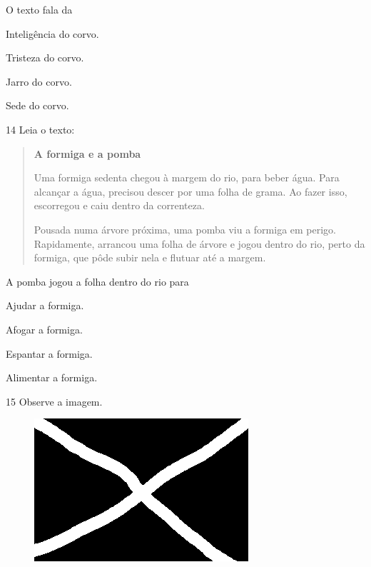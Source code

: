 
O texto fala da

\begin{escolha}
\item Inteligência do corvo.

\item Tristeza do corvo.

\item Jarro do corvo.

\item Sede do corvo.
\end{escolha}

\num{14} Leia o texto:

\begin{quote}
\textbf{A formiga e a pomba}

Uma formiga sedenta chegou à margem do rio, para beber água. Para alcançar a água, precisou descer por uma folha de grama. Ao fazer isso, escorregou e caiu dentro da correnteza.

Pousada numa árvore próxima, uma pomba viu a formiga em perigo. Rapidamente, arrancou uma folha de árvore e jogou dentro do rio, perto da formiga, que pôde subir nela e flutuar até a margem.
\end{quote}


A pomba jogou a folha dentro do rio para

\begin{escolha}
\item Ajudar a formiga.

\item Afogar a formiga.

\item Espantar a formiga.

\item Alimentar a formiga.
\end{escolha}


\num{15} Observe a imagem.

\begin{figure}[htpb!]
\centering
\includegraphics[width=.5\textwidth]{media/confederados.png}
\end{figure}

